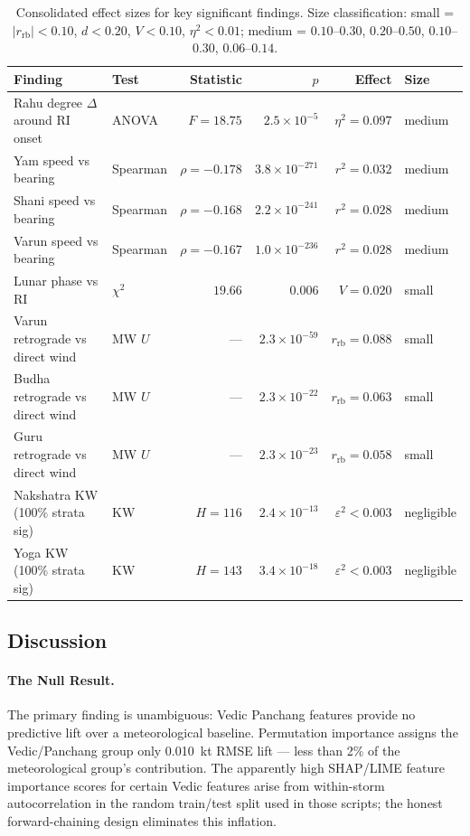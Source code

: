 \documentclass[12pt,a4paper]{article}
\begin{document}
\begin{table}[H]
  \centering
  \caption{Consolidated effect sizes for key significant findings.
  Size classification: small = $|r_{\text{rb}}| < 0.10$, $d < 0.20$,
  $V < 0.10$, $\eta^2 < 0.01$; medium = $0.10$--$0.30$, $0.20$--$0.50$,
  $0.10$--$0.30$, $0.06$--$0.14$.}
  \label{tab:effect_sizes}
  \small
  \begin{tabular}{p{5.5cm}lrrrl}
    \toprule
    \textbf{Finding} & \textbf{Test} & \textbf{Statistic} & \boldmath$p$ & \textbf{Effect} & \textbf{Size} \\
    \midrule
    Rahu degree $\Delta$ around RI onset & ANOVA & $F=18.75$ & $2.5\times10^{-5}$ & $\eta^2=0.097$ & medium \\
    Yam speed vs bearing & Spearman & $\rho=-0.178$ & $3.8\times10^{-271}$ & $r^2=0.032$ & medium \\
    Shani speed vs bearing & Spearman & $\rho=-0.168$ & $2.2\times10^{-241}$ & $r^2=0.028$ & medium \\
    Varun speed vs bearing & Spearman & $\rho=-0.167$ & $1.0\times10^{-236}$ & $r^2=0.028$ & medium \\
    Lunar phase vs RI & $\chi^2$ & $19.66$ & $0.006$ & $V=0.020$ & small \\
    Varun retrograde vs direct wind & MW $U$ & --- & $2.3\times10^{-59}$ & $r_\text{rb}=0.088$ & small \\
    Budha retrograde vs direct wind & MW $U$ & --- & $2.3\times10^{-22}$ & $r_\text{rb}=0.063$ & small \\
    Guru retrograde vs direct wind & MW $U$ & --- & $2.3\times10^{-23}$ & $r_\text{rb}=0.058$ & small \\
    Nakshatra KW (100\% strata sig) & KW & $H=116$ & $2.4\times10^{-13}$ & $\varepsilon^2 < 0.003$ & negligible \\
    Yoga KW (100\% strata sig) & KW & $H=143$ & $3.4\times10^{-18}$ & $\varepsilon^2 < 0.003$ & negligible \\
    \bottomrule
  \end{tabular}
\end{table}

\subsection{Discussion}

\paragraph{The Null Result.}
The primary finding is unambiguous: Vedic Panchang features provide no
predictive lift over a meteorological baseline. Permutation importance assigns
the Vedic/Panchang group only 0.010~kt RMSE lift --- less than 2\% of the
meteorological group's contribution. The apparently high SHAP/LIME feature
importance scores for certain Vedic features arise from within-storm
autocorrelation in the random train/test split used in those scripts; the
honest forward-chaining design eliminates this inflation.
\end{document}
